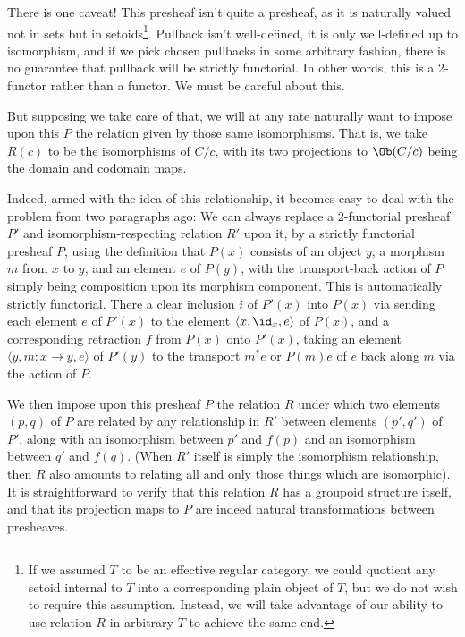 There is one caveat! This presheaf isn't quite a presheaf, as it is naturally valued not in sets but in setoids\footnote{If we assumed $T$ to be an effective regular category, we could quotient any setoid internal to $T$ into a corresponding plain object of $T$, but we do not wish to require this assumption. Instead, we will take advantage of our ability to use relation $R$ in arbitrary $T$ to achieve the same end.}. Pullback isn't well-defined, it is only well-defined up to isomorphism, and if we pick chosen pullbacks in some arbitrary fashion, there is no guarantee that pullback will be strictly functorial. In other words, this is a 2-functor rather than a functor. We must be careful about this.

But supposing we take care of that, we will at any rate naturally want to impose upon this $P$ the relation given by those same isomorphisms. That is, we take $R(c)$ to be the isomorphisms of $C/c$, with its two projections to $\Ob(C/c)$ being the domain and codomain maps.

Indeed, armed with the idea of this relationship, it becomes easy to deal with the problem from two paragraphs ago: We can always replace a 2-functorial presheaf $P'$ and isomorphism-respecting relation $R'$ upon it, by a strictly functorial presheaf $P$, using the definition that $P(x)$ consists of an object $y$, a morphism $m$ from $x$ to $y$, and an element $e$ of $P(y)$, with the transport-back action of $P$ simply being composition upon its morphism component. This is automatically strictly functorial. There a clear inclusion $i$ of $P'(x)$ into $P(x)$ via sending each element $e$ of $P'(x)$ to the element $\langle x, \id_x, e \rangle$ of $P(x)$, and a corresponding retraction $f$ from $P(x)$ onto $P'(x)$, taking an element $\langle y, m : x \to y, e \rangle$ of $P'(y)$ to the transport $m^* e$ or $P(m) e$ of $e$ back along $m$ via the action of $P$.

We then impose upon this presheaf $P$ the relation $R$ under which two elements $(p, q)$ of $P$ are related by any relationship in $R'$ between elements $(p', q')$ of $P'$, along with an isomorphism between $p'$ and $f(p)$ and an isomorphism between $q'$ and $f(q)$. (When $R'$ itself is simply the isomorphism relationship, then $R$ also amounts to relating all and only those things which are isomorphic). It is straightforward to verify that this relation $R$ has a groupoid structure itself, and that its projection maps to $P$ are indeed natural transformations between presheaves. 


